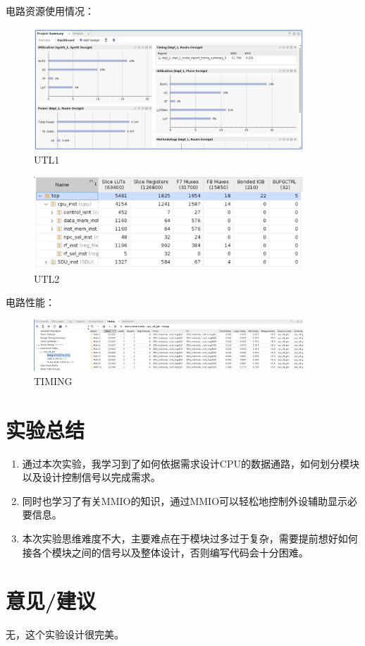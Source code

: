 \documentclass[a4paper]{article}
\begin{document}
电路资源使用情况：
\begin{figure}[H]
    \centering
    \includegraphics[width=0.9\textwidth]{3.png}
    \caption{UTL1}
    \label{fig:test1}
\end{figure}
\begin{figure}[H]
    \centering
    \includegraphics[width=0.9\textwidth]{4.png}
    \caption{UTL2}
    \label{fig:test1}
\end{figure}

电路性能：
\begin{figure}[H]
    \centering
    \includegraphics[width=0.9\textwidth]{5.png}
    \caption{TIMING}
    \label{fig:test1}
\end{figure}

\section {实验总结}
\begin{enumerate}
  \item 通过本次实验，我学习到了如何依据需求设计CPU的数据通路，如何划分模块以及设计控制信号以完成需求。
  \item 同时也学习了有关MMIO的知识，通过MMIO可以轻松地控制外设辅助显示必要信息。
  \item 本次实验思维难度不大，主要难点在于模块过多过于复杂，需要提前想好如何接各个模块之间的信号以及整体设计，否则编写代码会十分困难。
\end{enumerate}
\section {意见/建议}
无，这个实验设计很完美。
\end{document}
